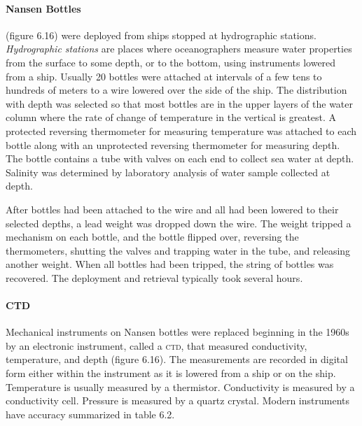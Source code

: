 \paragraph{Nansen Bottles} (figure 6.16) were deployed from ships stopped at hydrographic stations.
 
\textit{Hydrographic stations} are places where
oceanographers measure water properties from the surface to some depth, or to the
bottom, using instruments lowered from a ship. Usually 20 bottles were attached at
intervals of a few tens to hundreds of meters to a wire lowered over the side of the
ship. The distribution with depth was selected so that most bottles are in the upper
layers of the water column where the rate of change of temperature in the vertical
is greatest. A protected reversing thermometer for measuring
temperature was attached to each bottle along with an unprotected reversing
thermometer for measuring depth. The bottle contains a tube with
valves on each end to collect sea water at depth. Salinity was determined by laboratory
analysis of water sample collected at depth.

After bottles had been attached to the wire and all had been lowered to their
selected depths, a lead weight was dropped down the wire. The weight tripped a
mechanism on each bottle, and the bottle flipped over, reversing the
thermometers, shutting the valves and trapping water in the tube,
and releasing another weight. When all bottles had been tripped, the string of bottles was
recovered. The deployment and retrieval typically took several hours.

\paragraph{CTD} Mechanical instruments on Nansen bottles were replaced
beginning in the
1960s by an electronic instrument, called a \textsc{ctd}, that
measured conductivity, temperature, and depth (figure 6.16). The
measurements are recorded in digital form either within the
instrument as it is lowered from a ship or on the ship.
Temperature is usually measured by a thermistor. Conductivity is
measured by a conductivity cell. Pressure is measured by a quartz crystal.
Modern instruments have accuracy summarized in table 6.2.

